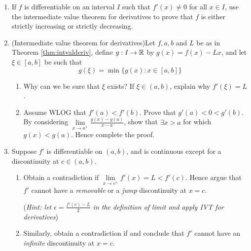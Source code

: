 \begin{exercises}
\begin{enumerate}
		
	  \item\label{exs:fincdec} If $f$ is differentiable on an interval $I$ such that $f'(x)\neq 0$ for all $x\in I$, use the intermediate value theorem for derivatives to prove that $f$ is either strictly increasing or strictly decreasing.
	  
	  
	  \item\label{exs:ivtderivs} (Intermediate value theorem for derivatives)\quad Let $f,a,b$ and $L$ be as in Theorem \ref{thm:intvalderiv}, define $g:I\to\mathbb{R}$ by $g(x)=f(x)-Lx$, and let $\xi\in[a,b]$ be such that
		\[
			g(\xi)=\min\bigl\{g(x):x\in[a,b]\bigr\}
		\]
		\begin{enumerate}
		  \item Why can we be sure that $\xi$ exists? If $\xi\in(a,b)$, explain why $f'(\xi)=L$.
			\item Assume WLOG that $f'(a)<f'(b)$. Prove that $g'(a)<0<g'(b)$. By considering $\lim\limits_{x\to a^+}\frac{g(x)-g(a)}{x-a}$, show that $\exists x>a$ for which $g(x)<g(a)$. Hence complete the proof.
		\end{enumerate}
	  
	  
	  \item Suppose $f'$ is differentiable on $(a,b)$, and is continuous except for a discontinuity at $c\in(a,b)$.
	  \begin{enumerate}
	    \item Obtain a contradiction if $\lim\limits_{x\to c^+}f'(x)=L<f'(c)$. Hence argue that $f'$ cannot have a \emph{removable} or a \emph{jump} discontinuity at $x=c$.\par
	    (\emph{Hint: let $\epsilon=\frac{f'(c)-L}2$ in the definition of limit and apply IVT for derivatives})
	    
	    \item Similarly, obtain a contradiction if  and conclude that $f'$ cannot have an \emph{infinite} discontinuity at $x=c$.
	    

\end{enumerate}
\end{enumerate}
\end{exercises}
